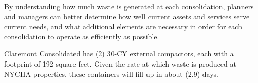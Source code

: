
    By understanding how much waste is generated at each consolidation, planners and managers
    can better determine how well current assets and services serve current needs, and what additional 
    elements are necessary in order for each consolidation to operate as efficiently as possible. 

    Claremont Consolidated has (2) 30-CY external compactors, each with a footprint of 192 square feet. Given the rate at which waste is produced at NYCHA properties, these containers will fill
    up in about (2.9) days.